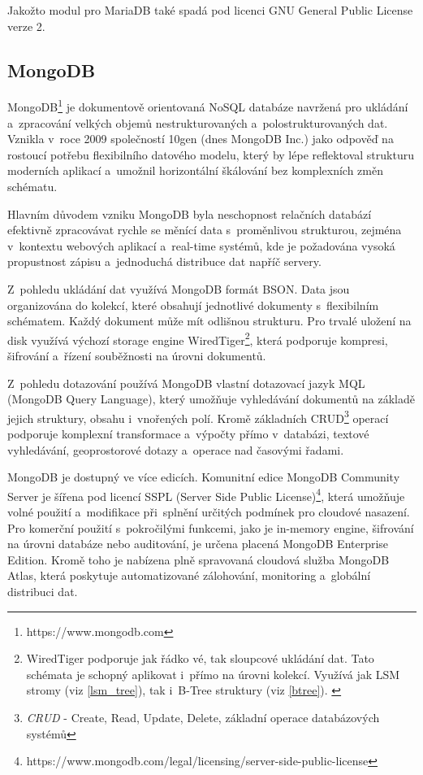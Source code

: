 Jakožto modul pro MariaDB také spadá pod licenci GNU General Public License verze 2.
\subsection{MongoDB}

MongoDB\footnote{https://www.mongodb.com} je dokumentově orientovaná NoSQL databáze navržená pro ukládání a~zpracování velkých objemů nestrukturovaných a~polostrukturovaných dat. 
Vznikla v~roce 2009 společností 10gen (dnes MongoDB Inc.) jako odpověď na rostoucí potřebu flexibilního datového modelu, který by lépe reflektoval strukturu moderních aplikací a~umožnil horizontální škálování bez komplexních změn schématu. 
\cite{mongodbdocs}

Hlavním důvodem vzniku MongoDB byla neschopnost relačních databází efektivně zpracovávat rychle se měnící data s~proměnlivou strukturou, zejména v~kontextu webových aplikací a~real-time systémů, kde je požadována vysoká propustnost zápisu a~jednoduchá distribuce dat napříč servery.
\cite{mongodbdocs}

Z~pohledu ukládání dat využívá MongoDB formát BSON. 
Data jsou organizována do kolekcí, které obsahují jednotlivé dokumenty s~flexibilním schématem. 
Každý dokument může mít odlišnou strukturu. 
Pro trvalé uložení na disk využívá výchozí storage engine WiredTiger\footnote{WiredTiger podporuje jak řádko    vé, tak sloupcové ukládání dat. Tato schémata je schopný aplikovat i~přímo na úrovni kolekcí. 
Využívá jak LSM stromy (viz \ref{lsm_tree}), tak i~B-Tree struktury (viz \ref{btree}).
\cite{wiredtiger}}, která podporuje kompresi, šifrování a~řízení souběžnosti na úrovni dokumentů. \cite{mongodbdocs}

Z~pohledu dotazování používá MongoDB vlastní dotazovací jazyk MQL (MongoDB Query Language), který umožňuje vyhledávání dokumentů na základě jejich struktury, obsahu i~vnořených polí. 
Kromě základních CRUD\footnote{\textit{CRUD} - Create, Read, Update, Delete, základní operace databázových systémů} operací podporuje komplexní transformace a~výpočty přímo v~databázi, textové vyhledávání, geoprostorové dotazy a~operace nad časovými řadami. 
\cite{mongodbdocs}

MongoDB je dostupný ve více edicích. 
Komunitní edice MongoDB Community Server je šířena pod licencí SSPL (Server Side Public License)\footnote{https://www.mongodb.com/legal/licensing/server-side-public-license}, která umožňuje volné použití a~modifikace při~splnění určitých podmínek pro cloudové nasazení. 
Pro komerční použití s~pokročilými funkcemi, jako je in-memory engine, šifrování na úrovni databáze nebo auditování, je určena placená MongoDB Enterprise Edition. 
Kromě toho je nabízena plně spravovaná cloudová služba MongoDB Atlas, která poskytuje automatizované zálohování, monitoring a~globální distribuci dat. 
\cite{mongodbdocs}

